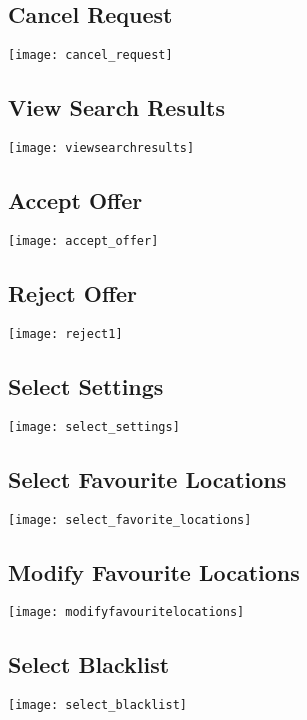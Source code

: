 \documentclass[english]{article}
\begin{document}
\subsection{Cancel Request}
\texttt{[image: cancel\_request]}

\subsection{View Search Results}
\texttt{[image: viewsearchresults]}

\subsection{Accept Offer}
\texttt{[image: accept\_offer]}

\subsection{Reject Offer}
\texttt{[image: reject1]}

\subsection{Select Settings}
\texttt{[image: select\_settings]}

\subsection{Select Favourite Locations}
\texttt{[image: select\_favorite\_locations]}

\subsection{Modify Favourite Locations}
\texttt{[image: modifyfavouritelocations]}

\subsection{Select Blacklist}
\texttt{[image: select\_blacklist]}
\end{document}
